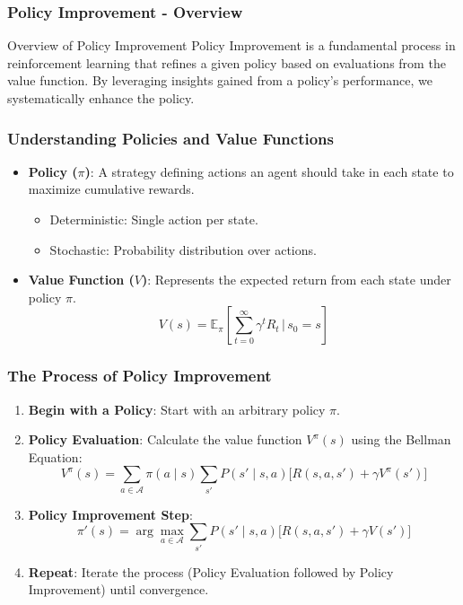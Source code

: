 \documentclass{beamer}
\begin{document}
\begin{frame}[fragile]
    \frametitle{Policy Improvement - Overview}
    \begin{block}{Overview of Policy Improvement}
        Policy Improvement is a fundamental process in reinforcement learning that refines a given policy based on evaluations from the value function. By leveraging insights gained from a policy's performance, we systematically enhance the policy.
    \end{block}
\end{frame}

\begin{frame}[fragile]
    \frametitle{Understanding Policies and Value Functions}
    \begin{itemize}
        \item \textbf{Policy ($\pi$)}: A strategy defining actions an agent should take in each state to maximize cumulative rewards.
            \begin{itemize}
                \item Deterministic: Single action per state.
                \item Stochastic: Probability distribution over actions.
            \end{itemize}
        
        \item \textbf{Value Function ($V$)}: Represents the expected return from each state under policy $\pi$.
        \begin{equation}
            V(s) = \mathbb{E}_{\pi} \left[ \sum_{t=0}^{\infty} \gamma^t R_t \,\bigg|\, s_0 = s \right]
        \end{equation}
    \end{itemize}
\end{frame}

\begin{frame}[fragile]
    \frametitle{The Process of Policy Improvement}
    \begin{enumerate}
        \item \textbf{Begin with a Policy}: Start with an arbitrary policy $\pi$.
        
        \item \textbf{Policy Evaluation}: Calculate the value function $V^{\pi}(s)$ using the Bellman Equation:
        \begin{equation}
            V^{\pi}(s) = \sum_{a \in \mathcal{A}} \pi(a \mid s) \sum_{s'} P(s' \mid s, a) \Big[ R(s, a, s') + \gamma V^{\pi}(s') \Big]
        \end{equation}
        
        \item \textbf{Policy Improvement Step}:
        \begin{equation}
            \pi'(s) = \arg\max_{a \in \mathcal{A}} \sum_{s'} P(s' \mid s, a) \Big[R(s, a, s') + \gamma V(s')\Big]
        \end{equation}
        
        \item \textbf{Repeat}: Iterate the process (Policy Evaluation followed by Policy Improvement) until convergence.
    \end{enumerate}
\end{frame}
\end{document}
